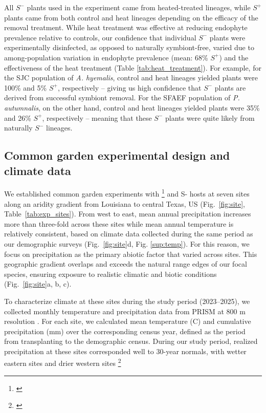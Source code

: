 \documentclass[12pt]{article}\usepackage[]{graphicx}\usepackage[dvipsnames]{xcolor}
\newcommand{\tom}[2]{{\color{red}{#1}}\footnote{\textit{\color{red}{#2}}}}
\begin{document}
All $S^-$ plants used in the experiment came from heated-treated lineages, while $S^+$ plants came from both control and heat lineages depending on the efficacy of the removal treatment. 
While heat treatment was effective at reducing endophyte prevalence relative to controls, our confidence that individual $S^-$ plants were experimentally disinfected, as opposed to naturally symbiont-free, varied due to among-population variation in endophyte prevalence (mean: 68\% $S^+$) and the effectiveness of the heat treatment (Table \ref{tab:heat_treatment}). 
For example, for the SJC population of \emph{A. hyemalis}, control and heat lineages yielded plants were 100\% and 5\% $S^+$, respectively -- giving us high confidence that $S^-$ plants are derived from successful symbiont removal. 
For the SFAEF population of \emph{P. autumnalis}, on the other hand, control and heat lineages yielded plants were 35\% and 26\% $S^+$, respectively -- meaning that these $S^-$ plants were quite likely from naturally $S^-$ lineages.

\subsection*{Common garden experimental design and climate data}
We established common garden experiments with \tom{S+}{Sometimes this is typed S+ and sometimes it is in math mode $S^+$. I would do a ctrl+F to make sure it's always consistent. Same for S-.} and S- hosts at seven sites along an aridity gradient from Louisiana to central Texas, US (Fig.~\ref{fig:site}, Table~\ref{tab:exp_sites}).
From west to east, mean annual precipitation increases more than three-fold across these sites while mean annual temperature is relatively consistent, based on climate data collected during the same period as our demographic surveys (Fig.~\ref{fig:site}d, Fig. \ref{sup:temp}).
For this reason, we focus on precipitation as the primary abiotic factor that varied across sites.  
This geographic gradient overlaps and exceeds the natural range edges of our focal species, ensuring exposure to realistic climatic and biotic conditions (Fig.~\ref{fig:site}a, b, c). 

To characterize climate at these sites during the study period (2023–2025), we collected monthly temperature and precipitation data from PRISM at 800 m resolution \citep{PRISM2024}. 
For each site, we calculated mean temperature (\textdegree C) and cumulative precipitation (mm) over the corresponding census year, defined as the period from transplanting to the demographic census.
During our study period, realized precipitation at these sites corresponded well to 30-year normals, with wetter eastern sites and drier western sites \tom{(Fig.~\ref{fig:site}d). }{Panel F is missing a y-axis label.}
\end{document}
